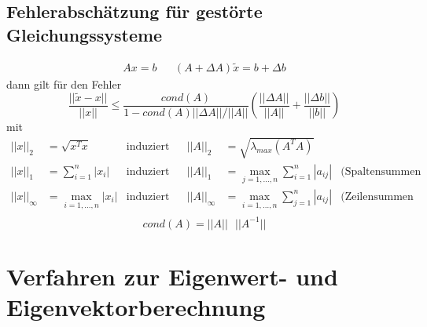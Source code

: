 \documentclass[
ngerman,
accentcolor=9c,%
type=intern,
marginpar=false
]{tudapub}
\begin{document}
        \subsection{Fehlerabschätzung für gestörte Gleichungssysteme}
            \begin{align*}
                Ax = b && (A+ \Delta A)\tilde{x} = b + \Delta b
            \end{align*}
            dann gilt für den Fehler
            \begin{equation*}
                \dfrac{||\tilde{x} - x||}{||x||} \leq \dfrac{cond(A)}{1-cond(A)||\Delta A|| / ||A||} \left(\dfrac{||\Delta A||}{||A||} + \dfrac{|| \Delta b||}{||b||}\right)
            \end{equation*}
            mit
            \begin{align*} %
                ||x||_2 &= \sqrt{x^Tx} & \text{induziert} &&||A||_2 &= \sqrt{\lambda_{max}(A^TA)}\\
                ||x||_1 &= \sum^n_{i=1}|x_i| & \text{induziert} && ||A||_1 &= \max_{j=1,\dots,n} \sum^n_{i=1} |a_{ij}| & \text{(Spaltensummen Norm = ``größte'' Spalte)}\\
                ||x||_\infty &= \max_{i=1,\dots,n}|x_i| & \text{induziert} && ||A||_\infty &= \max_{i=1,\dots,n} \sum^n_{j=1} |a_{ij}| & \text{(Zeilensummen Norm = ``größte'' Zeile)}\\
            \end{align*}
            \begin{equation*}
                cond(A) = ||A||\mbox{ }||A^{-1}||
            \end{equation*}

    \newpage
    \section{Verfahren zur Eigenwert- und Eigenvektorberechnung}
\end{document}
